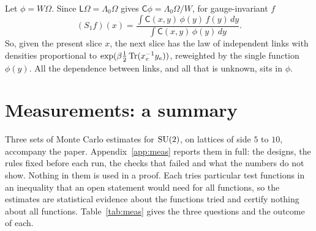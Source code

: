 \begin{remark}\label{r:doob}
Let $\phi=W\Omega$. Since $\mathsf L\Omega=\Lambda_0\Omega$ gives $\mathsf C\phi=\Lambda_0\Omega/W$, for
gauge-invariant $f$
\[
(S_1f)(x)=\frac{\int\mathsf C(x,y)\,\phi(y)\,f(y)\,dy}{\int\mathsf C(x,y)\,\phi(y)\,dy}.
\]
So, given the present slice $x$, the next slice has the law of independent links with densities proportional
to $\exp(\beta\tfrac12\operatorname{Tr}(x_e^{-1}y_e))$, reweighted by the single function $\phi(y)$. All the dependence
between links, and all that is unknown, sits in $\phi$.
\end{remark}

\section{Measurements: a summary}\label{s:evid}
Three sets of Monte Carlo estimates for $\mathrm{SU}(2)$, on lattices of side $5$ to $10$, accompany the paper.
Appendix~\ref{app:meas} reports them in full: the designs, the rules fixed before each run, the checks that
failed and what the numbers do not show. Nothing in them is used in a proof. Each tries particular test
functions in an inequality that an open statement would need for all functions, so the estimates are
statistical evidence about the functions tried and certify nothing about all functions.
Table~\ref{tab:meas} gives the three questions and the outcome of each.

